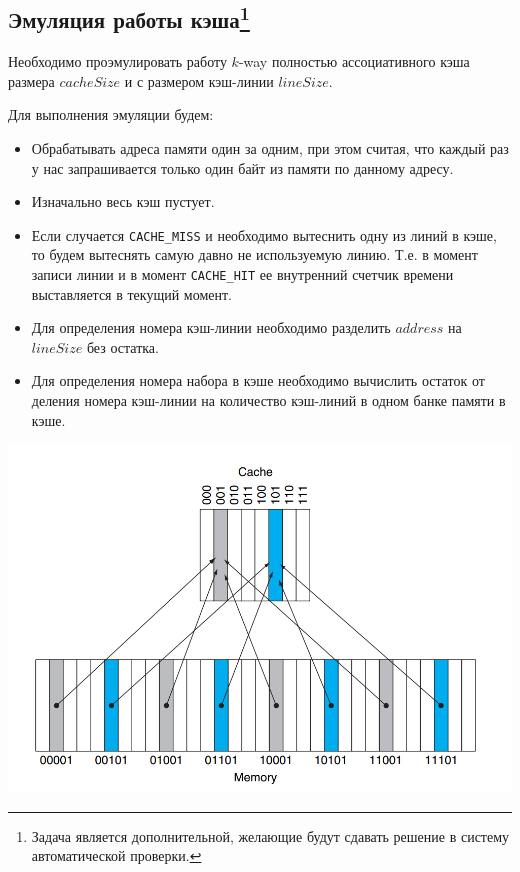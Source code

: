 
\subsection{Эмуляция работы кэша\footnote{Задача является дополнительной, желающие будут сдавать решение в систему автоматической проверки.}}

Необходимо проэмулировать работу $k$-way полностью ассоциативного кэша размера $cacheSize$ и с размером кэш-линии $lineSize$.

Для выполнения эмуляции будем:
\begin{itemize}
\item Обрабатывать адреса памяти один за одним, при этом считая, что каждый раз у нас запрашивается только один байт из памяти по данному адресу.
\item Изначально весь кэш пустует.
\item Если случается \texttt{CACHE\_MISS} и необходимо вытеснить одну из линий в кэше,
то будем вытеснять самую давно не используемую линию.
Т.е. в момент записи линии и в момент \texttt{CACHE\_HIT} ее внутренний счетчик времени выставляется в текущий момент.
\item Для определения номера кэш-линии необходимо разделить $address$ на $lineSize$ без остатка.
\item Для определения номера набора в кэше необходимо вычислить остаток от деления номера кэш-линии
на количество кэш-линий в одном банке памяти в кэше.
\end{itemize}

\begin{center}
\includegraphics[scale=0.4]{images/cache.png}
\end{center}

